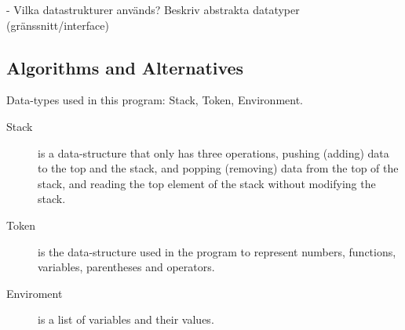 \documentclass[12pt,a4paper]{article}
\begin{document}
- Vilka datastrukturer används? Beskriv abstrakta datatyper (gränssnitt/interface)
\fi

\subsection{Algorithms and Alternatives}
\textnormal{ Data-types used in this program: Stack, Token, Environment.}
\begin{description}
  \item [Stack] is a data-structure that only has three operations, pushing (adding) data to the top and the stack, and popping (removing) 
  data from the top of the stack, and reading the top element of the stack without modifying the stack.

  \item[Token] is the data-structure used in the program to represent numbers, functions, variables, parentheses and operators.

  \item[Enviroment] is a list of variables and their values.
\end{description}
\end{document}
